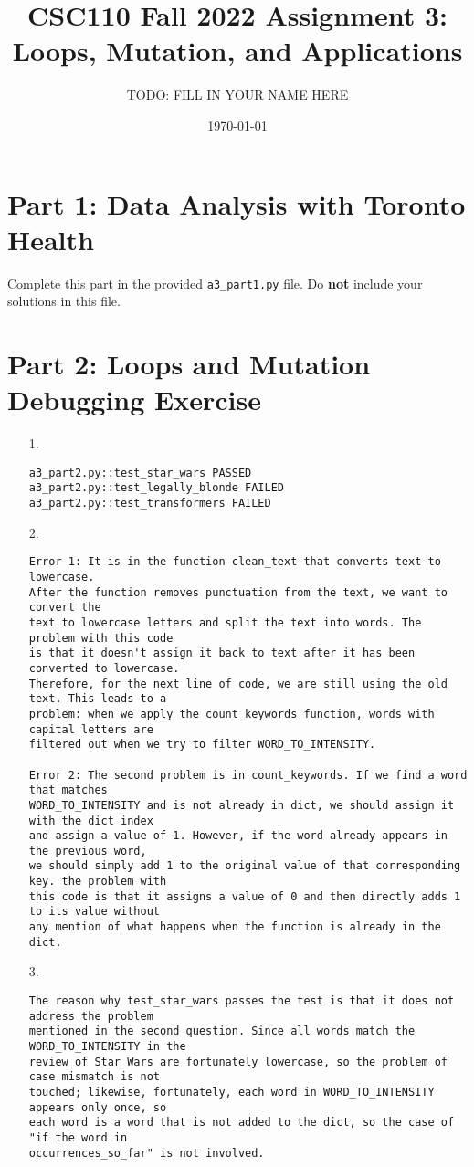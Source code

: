 \documentclass[11pt]{article}
\title{CSC110 Fall 2022 Assignment 3: Loops, Mutation, and Applications}
\author{TODO: FILL IN YOUR NAME HERE}
\date{\today}
\begin{document}
\maketitle

\section*{Part 1: Data Analysis with Toronto Health}

Complete this part in the provided \texttt{a3\_part1.py} file.
Do \textbf{not} include your solutions in this file.

\section*{Part 2: Loops and Mutation Debugging Exercise}

\begin{enumerate}
\item[1.]
\begin{verbatim}
a3_part2.py::test_star_wars PASSED
a3_part2.py::test_legally_blonde FAILED
a3_part2.py::test_transformers FAILED
\end{verbatim}



\item[2.]
\begin{verbatim}
Error 1: It is in the function clean_text that converts text to lowercase.
After the function removes punctuation from the text, we want to convert the
text to lowercase letters and split the text into words. The problem with this code
is that it doesn't assign it back to text after it has been converted to lowercase.
Therefore, for the next line of code, we are still using the old text. This leads to a
problem: when we apply the count_keywords function, words with capital letters are
filtered out when we try to filter WORD_TO_INTENSITY.

Error 2: The second problem is in count_keywords. If we find a word that matches
WORD_TO_INTENSITY and is not already in dict, we should assign it with the dict index
and assign a value of 1. However, if the word already appears in the previous word,
we should simply add 1 to the original value of that corresponding key. the problem with
this code is that it assigns a value of 0 and then directly adds 1 to its value without
any mention of what happens when the function is already in the dict.
\end{verbatim}

\item[3.]
\begin{verbatim}
The reason why test_star_wars passes the test is that it does not address the problem
mentioned in the second question. Since all words match the WORD_TO_INTENSITY in the
review of Star Wars are fortunately lowercase, so the problem of case mismatch is not
touched; likewise, fortunately, each word in WORD_TO_INTENSITY appears only once, so
each word is a word that is not added to the dict, so the case of "if the word in
occurrences_so_far" is not involved.
\end{verbatim}

\end{enumerate}
\end{document}

